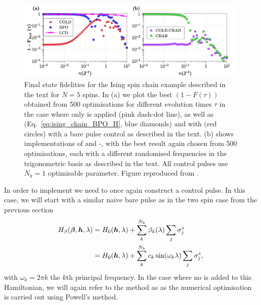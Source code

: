\begin{figure}[t]
    \centering
    \includegraphics[width=\linewidth]{images/IsingUnconstrained.jpg} \caption[Applying COLD and COLD-CRAB to the Ising chain for 5 spins without constraints on the driving amplitudes.]{Final state fidelities for the Ising spin chain example described in the text for $N=5$ spins. In (a) we plot the best $(1 - F(\tau))$ obtained from 500 optimisations for different evolution times $\tau$ in the case where only   is applied (pink dash-dot line), as well as  (Eq.~\eqref{eq:ising_chain_BPO_H}, blue diamonds) and  with   (red circles) with a bare pulse control as described in the text. (b) shows implementations of  and -, with the best result again chosen from 500 optimisations, each with a different randomised frequencies in the trigonometric basis as described in the text. All control pulses use $N_k = 1$ optimisable parameter. Figure reproduced from \cite{cepaite_cold_2023}.} \label{fig:ising_unconstrained}
\end{figure}

In order to implement  we need to once again construct a control pulse. In this case, we will start with a similar naive bare pulse as in the two spin case from the previous section
\begin{equation}\label{eq:ising_chain_BPO_H}
    \begin{aligned}
        H_{\beta}(\boldsymbol{\beta}, \boldsymbol{h}, \lambda) &= H_0(\boldsymbol{h}, \lambda) + \sum_k^{N_k} \beta_k(\lambda) \sum_j \sigma^z_j \\
        &= H_0(\boldsymbol{h}, \lambda) + \sum_k^{N_k} c_k \sin(\omega_k \lambda) \sum_j \sigma^z_j,
    \end{aligned}
\end{equation}
with $\omega_k = 2\pi k$ the $k$th principal frequency. In the case where no  is added to this Hamiltonian, we will again refer to the method as  as the numerical optimisation is carried out using Powell's method.

